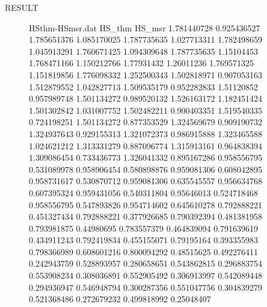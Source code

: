 \documentclass[a0paper,portrait]{baposter}
\begin{document}
\begin{poster}
\begin{posterbox}[name=result,column=2,below=wtank]{RESULT}
    \begin{figure}[H]
        \begin{filecontents}{HSthm-HSmsr.dat}
                HS_thm	HS_msr
                1.781440728	0.925436527
                1.785651376	1.085170025
                1.787735635	1.027713311
                1.782498659	1.045913291
                1.760671425	1.094309648
                1.787735635	1.15104453
                1.768471166	1.150212766
                1.77931432	1.26011236
                1.769571325	1.151819856
                1.776098332	1.252500343
                1.502818971	0.907053163
                1.512879552	1.042827713
                1.509535179	0.952282833
                1.51120852	0.957989748
                1.501134272	0.989520132
                1.526163172	1.182451424
                1.501302842	1.031007752
                1.502482211	0.900403351
                1.519540335	0.724198251
                1.501134272	0.877353529
                1.324569679	0.909190732
                1.324937643	0.929155313
                1.321072373	0.986915888
                1.323465588	1.024621212
                1.313331279	0.887096774
                1.315913161	0.964838394
                1.309086454	0.733436773
                1.326041332	0.895167286
                0.958556795	0.531089978
                0.958906454	0.580898876
                0.959081306	0.608042895
                0.958731617	0.530870712
                0.959081306	0.635545557
                0.956634768	0.607395324
                0.959431056	0.540311804
                0.95646013	0.524718468
                0.958556795	0.547893826
                0.954714602	0.645610278
                0.792888221	0.451327434
                0.792888221	0.377926685
                0.790392394	0.481381958
                0.793981875	0.44980695
                0.783557379	0.464839094
                0.791639619	0.434911243
                0.792419834	0.455155071
                0.79195164	0.393355983
                0.798366989	0.608601216
                0.800094292	0.48515625
                0.492276411	0.242943759
                0.528893957	0.280658651
                0.543862815	0.296883754
                0.553908234	0.308036891
                0.552905492	0.306913997
                0.542089448	0.294936947
                0.546948794	0.300287356
                0.551047756	0.304839279
                0.521368486	0.272679232
                0.499818992	0.25048407                  
            \end{filecontents}


\end{figure}
\end{posterbox}
\end{poster}
\end{document}
